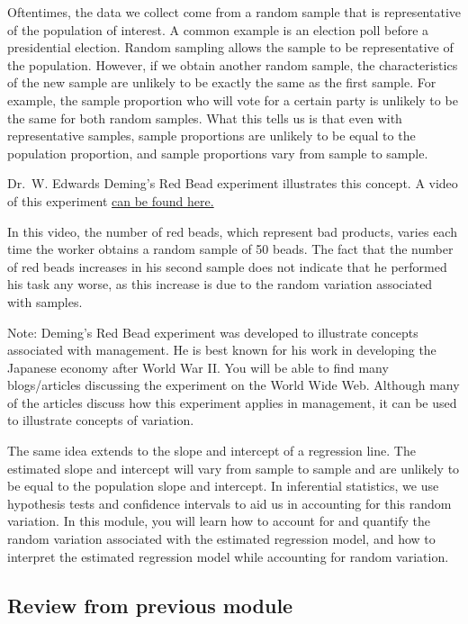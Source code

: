 \documentclass[
]{book}
\begin{document}
Oftentimes, the data we collect come from a random sample that is representative of the population of interest. A common example is an election poll before a presidential election. Random sampling allows the sample to be representative of the population. However, if we obtain another random sample, the characteristics of the new sample are unlikely to be exactly the same as the first sample. For example, the sample proportion who will vote for a certain party is unlikely to be the same for both random samples. What this tells us is that even with representative samples, sample proportions are unlikely to be equal to the population proportion, and sample proportions vary from sample to sample.

Dr.~W. Edwards Deming's Red Bead experiment illustrates this concept. A video of this experiment \href{https://www.youtube.com/watch?v=R3ewHrpqclA}{can be found here.}

In this video, the number of red beads, which represent bad products, varies each time the worker obtains a random sample of 50 beads. The fact that the number of red beads increases in his second sample does not indicate that he performed his task any worse, as this increase is due to the random variation associated with samples.

Note: Deming's Red Bead experiment was developed to illustrate concepts associated with management. He is best known for his work in developing the Japanese economy after World War II. You will be able to find many blogs/articles discussing the experiment on the World Wide Web. Although many of the articles discuss how this experiment applies in management, it can be used to illustrate concepts of variation.

The same idea extends to the slope and intercept of a regression line. The estimated slope and intercept will vary from sample to sample and are unlikely to be equal to the population slope and intercept. In inferential statistics, we use hypothesis tests and confidence intervals to aid us in accounting for this random variation. In this module, you will learn how to account for and quantify the random variation associated with the estimated regression model, and how to interpret the estimated regression model while accounting for random variation.

\hypertarget{review-from-previous-module}{%
\subsection{Review from previous module}\label{review-from-previous-module}}
\end{document}
